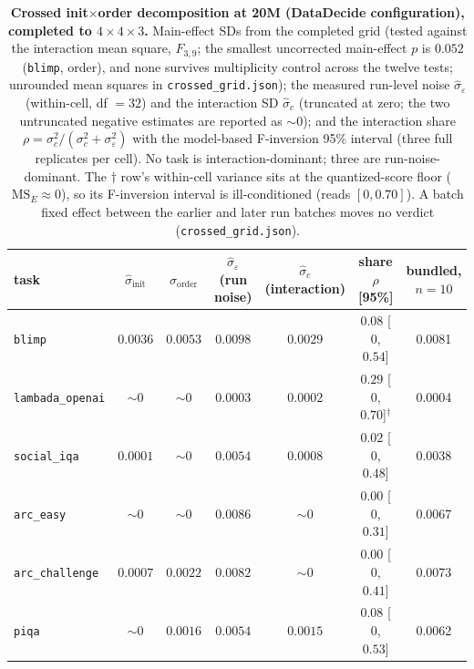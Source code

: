\begin{table}[!htbp]
\centering
\caption{\textbf{Crossed init$\times$order decomposition at 20M (DataDecide configuration),
completed to $4{\times}4{\times}3$.} Main-effect SDs from the completed grid (tested against the interaction mean square, $F_{3,9}$; the smallest uncorrected main-effect $p$ is $0.052$ (\texttt{blimp}, order), and none survives multiplicity control across the twelve tests; unrounded mean squares in \texttt{crossed\_grid.json});
the measured run-level noise $\hat\sigma_\varepsilon$ (within-cell, df $= 32$) and the interaction SD $\hat\sigma_c$ (truncated at zero; the two untruncated negative estimates are reported as ${\sim}0$); and the interaction share $\rho = \sigma_c^2/(\sigma_c^2 + \sigma_\varepsilon^2)$ with the
model-based F-inversion 95\% interval (three full replicates per cell). No task is
interaction-dominant; three are run-noise-dominant.
The $\dagger$ row's within-cell variance sits at the quantized-score floor
($\mathrm{MS}_E \approx 0$), so its F-inversion interval is ill-conditioned (reads $[0, 0.70]$). A batch fixed effect between the earlier and later run
batches moves no verdict (\texttt{crossed\_grid.json}).}
\label{tab:crossed-20m}
\footnotesize
\begin{tabular}{@{}lcccccc@{}}
\toprule
task & $\hat\sigma_{\mathrm{init}}$ & $\hat\sigma_{\mathrm{order}}$ & $\hat\sigma_\varepsilon$ (run noise) & $\hat\sigma_c$ (interaction) & share $\rho$ [95\%] & bundled, $n{=}10$ \\
\midrule
\texttt{blimp} & $0.0036$ & $0.0053$ & $0.0098$ & $0.0029$ & $0.08$ [$0$, $0.54$] & 0.0081 \\
\texttt{lambada\_openai} & ${\sim}0$ & ${\sim}0$ & $0.0003$ & $0.0002$ & $0.29$ [$0$, $0.70$]$^\dagger$ & 0.0004 \\
\texttt{social\_iqa} & $0.0001$ & ${\sim}0$ & $0.0054$ & $0.0008$ & $0.02$ [$0$, $0.48$] & 0.0038 \\
\texttt{arc\_easy} & ${\sim}0$ & ${\sim}0$ & $0.0086$ & ${\sim}0$ & $0.00$ [$0$, $0.31$] & 0.0067 \\
\texttt{arc\_challenge} & $0.0007$ & $0.0022$ & $0.0082$ & ${\sim}0$ & $0.00$ [$0$, $0.41$] & 0.0073 \\
\texttt{piqa} & ${\sim}0$ & $0.0016$ & $0.0054$ & $0.0015$ & $0.08$ [$0$, $0.53$] & 0.0062 \\
\bottomrule
\end{tabular}
\end{table}

